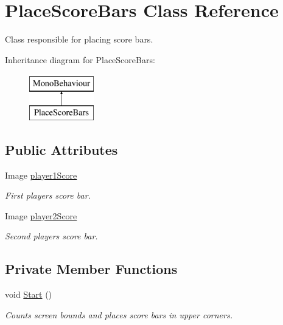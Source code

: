 \hypertarget{class_place_score_bars}{}\section{Place\+Score\+Bars Class Reference}
\label{class_place_score_bars}


Class responsible for placing score bars.  


Inheritance diagram for Place\+Score\+Bars\+:\begin{figure}[H]
\begin{center}
\leavevmode
\includegraphics[height=2.000000cm]{class_place_score_bars}
\end{center}
\end{figure}
\subsection*{Public Attributes}
\begin{DoxyCompactItemize}
\item 
Image \mbox{\hyperlink{class_place_score_bars_acbdc64a22696d614a80fb2290e2e7be7}{player1\+Score}}
\begin{DoxyCompactList}\small\item\em First player\textquotesingle{}s score bar. \end{DoxyCompactList}\item 
Image \mbox{\hyperlink{class_place_score_bars_a53a2fc54c5de9160788eac17a2ff9e90}{player2\+Score}}
\begin{DoxyCompactList}\small\item\em Second player\textquotesingle{}s score bar. \end{DoxyCompactList}\end{DoxyCompactItemize}
\subsection*{Private Member Functions}
\begin{DoxyCompactItemize}
\item 
void \mbox{\hyperlink{class_place_score_bars_adf99a036ca929e8b17236267e9dc3737}{Start}} ()
\begin{DoxyCompactList}\small\item\em Counts screen bounds and places score bars in upper corners. \end{DoxyCompactList}\end{DoxyCompactItemize}


